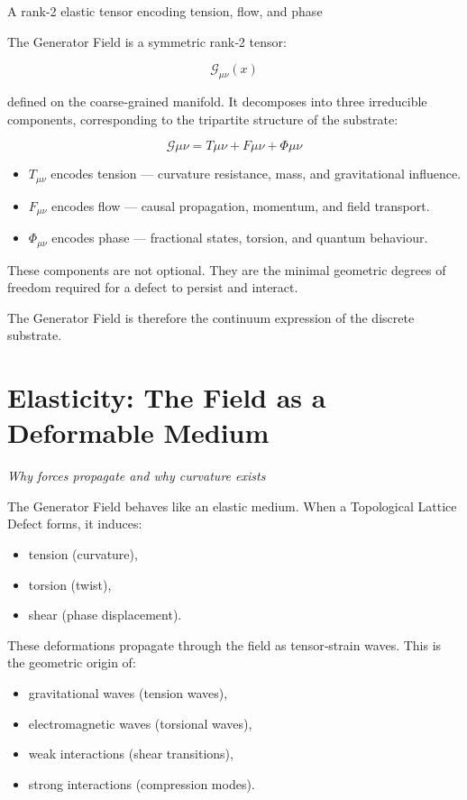 \documentclass[reprint,amsmath,amssymb,aps,prl,floatfix]{revtex4-2}
\begin{document}
\begin{itemize}
A rank‑2 elastic tensor encoding tension, flow, and phase
\medskip

The Generator Field is a symmetric rank‑2 tensor:

\[
\mathcal{G}_{\mu\nu}(x)
\]

defined on the coarse‑grained manifold. It decomposes into three irreducible components, corresponding to the tripartite structure of the substrate:

\[
\mathcal{G}{\mu\nu} = T{\mu\nu} + F{\mu\nu} + \Phi{\mu\nu}
\]
\begin{itemize}
\item \(T_{\mu\nu}\) encodes tension — curvature resistance, mass, and gravitational influence.  
\item \(F_{\mu\nu}\) encodes flow — causal propagation, momentum, and field transport.  
\item \(\Phi_{\mu\nu}\) encodes phase — fractional states, torsion, and quantum behaviour.
\end{itemize}
\medskip

These components are not optional.  
They are the minimal geometric degrees of freedom required for a defect to persist and interact.
\medskip

The Generator Field is therefore the continuum expression of the discrete substrate.

\section{Elasticity: The Field as a Deformable Medium}
\textit{Why forces propagate and why curvature exists}

The Generator Field behaves like an elastic medium.  
When a Topological Lattice Defect forms, it induces:
\begin{itemize}
\item tension (curvature),  
\item torsion (twist),  
\item shear (phase displacement).
\end{itemize}
\medskip

These deformations propagate through the field as tensor‑strain waves.  
This is the geometric origin of:
\begin{itemize}
\item gravitational waves (tension waves),  
\item electromagnetic waves (torsional waves),  
\item weak interactions (shear transitions),  
\item strong interactions (compression modes).
\end{itemize}
\medskip


\end{itemize}
\end{document}
